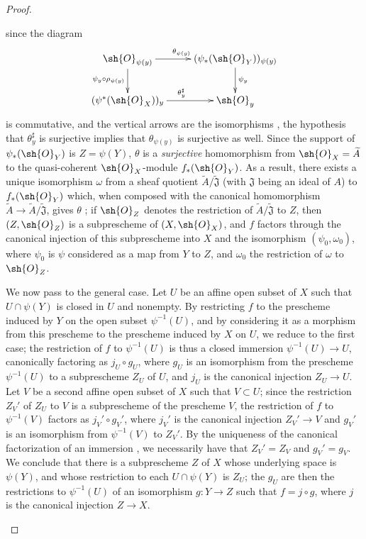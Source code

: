 \begin{proof}
\begin{enumerate}
    since the diagram
    \[
      \xymatrix{
        \sh{O}_{\psi(y)}\ar[r]^{\theta_{\psi(y)}}\ar[d]_{\psi_y\circ\rho_{\psi(y)}} &
        (\psi_*(\sh{O}_Y))_{\psi(y)}\ar[d]^{\psi_y}\\
        (\psi^*(\sh{O}_X))_y\ar[r]^{\theta_y^\sharp} &
        \sh{O}_y
      }
    \]
    is commutative, and the vertical arrows are the isomorphisms , the hypothesis that $\theta_y^\sharp$ is surjective implies that $\theta_{\psi(y)}$ is surjective as well.
    Since the support of $\psi_*(\sh{O}_Y)$ is $Z=\psi(Y)$, $\theta$ is a \emph{surjective} homomorphism from $\sh{O}_X=\widetilde{A}$ to the quasi-coherent $\sh{O}_X$-module $f_*(\sh{O}_Y)$.
    As a result, there exists a unique isomorphism $\omega$ from a sheaf quotient $\widetilde{A}/\widetilde{\mathfrak{J}}$ (with $\mathfrak{J}$ being an ideal of $A$) to $f_*(\sh{O}_Y)$ which, when composed with the canonical homomorphism $\widetilde{A}\to\widetilde{A}/\widetilde{\mathfrak{J}}$, gives $\theta$ ;
    if $\sh{O}_Z$ denotes the restriction of $\widetilde{A}/\widetilde{\mathfrak{J}}$ to $Z$, then $(Z,\sh{O}_Z)$ is a subprescheme of $(X,\sh{O}_X)$, and $f$ factors through the canonical injection of this subprescheme into $X$ and the isomorphism $(\psi_0,\omega_0)$, where $\psi_0$ is $\psi$ considered as a map from $Y$ to $Z$, and $\omega_0$ the restriction of $\omega$ to $\sh{O}_Z$.

    We now pass to the general case.
    Let $U$ be an affine open subset of $X$ such that $U\cap\psi(Y)$ is closed in $U$ and nonempty.
    By restricting $f$ to the prescheme induced by $Y$ on the open subset $\psi^{-1}(U)$, and by considering it as a morphism from this prescheme to the prescheme induced by $X$ on $U$, we reduce to the first case;
    the restriction of $f$ to $\psi^{-1}(U)$ is thus a closed immersion $\psi^{-1}(U)\to U$, canonically factoring as $j_U\circ g_U$, where $g_U$ is an isomorphism from the prescheme $\psi^{-1}(U)$ to a subprescheme $Z_U$ of $U$, and $j_U$ is the canonical injection $Z_U\to U$.
    Let $V$ be a second affine open subset of $X$ such that $V\subset U$;
    since the restriction $Z_V'$ of $Z_U$ to $V$ is a subprescheme of the prescheme $V$, the restriction of $f$ to $\psi^{-1}(V)$ factors as $j_V'\circ g_V'$, where $j_V'$ is the canonical injection $Z_V'\to V$ and $g_V'$ is an isomorphism from $\psi^{-1}(V)$ to $Z_V'$.
    By the uniqueness of the canonical factorization of an immersion , we necessarily have that $Z_V'=Z_V$ and $g_V'=g_V$.
    We conclude  that there is a subprescheme $Z$ of $X$ whose underlying space is $\psi(Y)$, and whose restriction to each $U\cap\psi(Y)$ is $Z_U$;
    the $g_U$ are then the restrictions to $\psi^{-1}(U)$ of an isomorphism $g:Y\to Z$ such that $f=j\circ g$, where $j$ is the canonical injection $Z\to X$.
\end{enumerate}
\end{proof}

